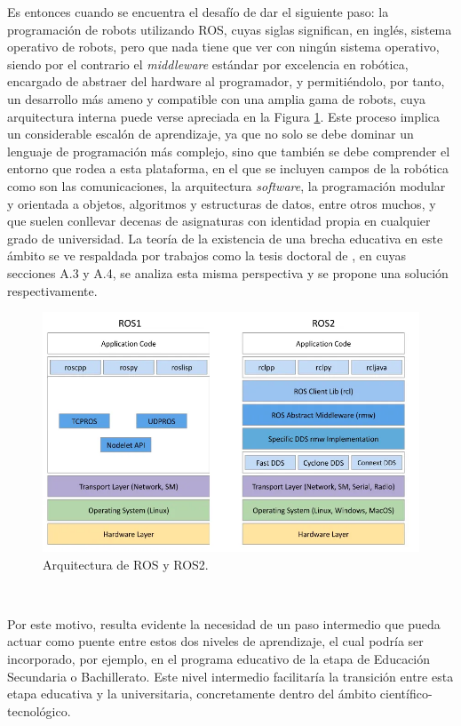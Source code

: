 Es entonces cuando se encuentra el desafío de dar el siguiente paso: la
programación de robots utilizando ROS, cuyas siglas significan, en inglés,
sistema operativo de robots, pero que nada tiene que ver con ningún sistema
operativo, siendo por el contrario el \textit{middleware} estándar por
excelencia en robótica, encargado de abstraer del hardware al programador, y
permitiéndolo, por tanto, un desarrollo más ameno y compatible con una amplia
gama de robots, cuya arquitectura interna puede verse apreciada en la Figura
\ref{fig:ros}.
Este proceso implica un considerable escalón de aprendizaje, ya que no solo se
debe dominar un lenguaje de programación más complejo, sino que también se debe
comprender el entorno que rodea a esta plataforma, en el que se incluyen campos
de la robótica como son las comunicaciones, la arquitectura \textit{software},
la programación modular y orientada a objetos, algoritmos y estructuras de
datos, entre otros muchos, y que suelen conllevar decenas de asignaturas con
identidad propia en cualquier grado de universidad.
La teoría de la existencia de una brecha educativa en este ámbito se ve
respaldada por trabajos como la tesis doctoral de \cite{vega2018}, en cuyas
secciones A.3 y A.4, se analiza esta misma perspectiva y se propone una solución
respectivamente.

\begin{figure} [h!]
  \begin{center}
    \includegraphics[width=12cm]{figs/ROS_and_ROS2}
  \end{center}
  \caption{Arquitectura de ROS y ROS2.}
  \label{fig:ros}
\end{figure}\

Por este motivo, resulta evidente la necesidad de un paso intermedio que pueda
actuar como puente entre estos dos niveles de aprendizaje, el cual podría ser
incorporado, por ejemplo, en el programa educativo de la etapa de Educación
Secundaria o Bachillerato.
Este nivel intermedio facilitaría la transición entre esta etapa educativa y la
universitaria, concretamente dentro del ámbito científico-tecnológico.



